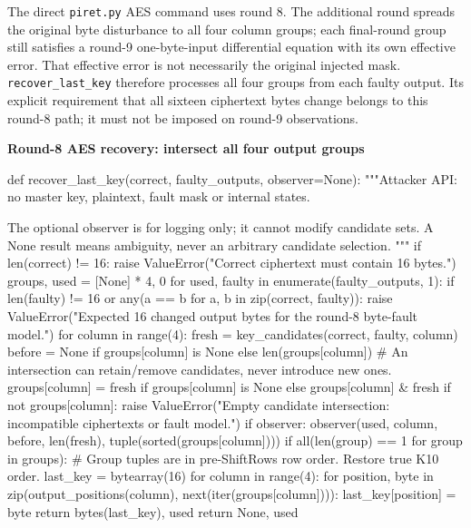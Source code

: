 The direct \texttt{piret.py} AES command uses round 8. The additional round spreads the original byte disturbance to all four column groups; each final-round group still satisfies a round-9 one-byte-input differential equation with its own effective error. That effective error is not necessarily the original injected mask. \texttt{recover\_\allowbreak{}last\_\allowbreak{}key} therefore processes all four groups from each faulty output. Its explicit requirement that all sixteen ciphertext bytes change belongs to this round-8 path; it must not be imposed on round-9 observations.
\par\smallskip\noindent\textbf{Round-8 AES recovery: intersect all four output groups}\par
\begin{lightcode}
def recover_last_key(correct, faulty_outputs, observer=None):
    """Attacker API: no master key, plaintext, fault mask or internal states.

    The optional observer is for logging only; it cannot modify candidate sets.
    A None result means ambiguity, never an arbitrary candidate selection.
    """
    if len(correct) != 16:
        raise ValueError("Correct ciphertext must contain 16 bytes.")
    groups, used = [None] * 4, 0
    for used, faulty in enumerate(faulty_outputs, 1):
        if len(faulty) != 16 or any(a == b for a, b in zip(correct, faulty)):
            raise ValueError("Expected 16 changed output bytes for the round-8 byte-fault model.")
        for column in range(4):
            fresh = key_candidates(correct, faulty, column)
            before = None if groups[column] is None else len(groups[column])
            # An intersection can retain/remove candidates, never introduce new ones.
            groups[column] = fresh if groups[column] is None else groups[column] & fresh
            if not groups[column]:
                raise ValueError("Empty candidate intersection: incompatible ciphertexts or fault model.")
            if observer:
                observer(used, column, before, len(fresh), tuple(sorted(groups[column])))
        if all(len(group) == 1 for group in groups):
            # Group tuples are in pre-ShiftRows row order. Restore true K10 order.
            last_key = bytearray(16)
            for column in range(4):
                for position, byte in zip(output_positions(column), next(iter(groups[column]))):
                    last_key[position] = byte
            return bytes(last_key), used
    return None, used
\end{lightcode}

